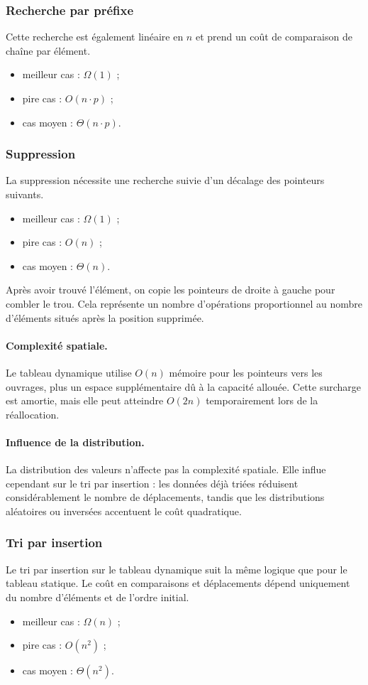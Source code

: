 \documentclass[12pt,a4paper]{article}
\begin{document}
\subsubsection{Recherche par préfixe}
Cette recherche est également linéaire en $n$ et prend un coût de comparaison de chaîne par élément.
\begin{itemize}
  \item meilleur cas : $\Omega(1)$ ;
  \item pire cas : $O(n \cdot p)$ ;
  \item cas moyen : $\Theta(n \cdot p)$.
\end{itemize}

\subsubsection{Suppression}
La suppression nécessite une recherche suivie d’un décalage des pointeurs suivants.
\begin{itemize}
  \item meilleur cas : $\Omega(1)$ ;
  \item pire cas : $O(n)$ ;
  \item cas moyen : $\Theta(n)$.
\end{itemize}
Après avoir trouvé l’élément, on copie les pointeurs de droite à gauche pour combler le trou. Cela représente un nombre d’opérations proportionnel au nombre d’éléments situés après la position supprimée.

\paragraph{Complexité spatiale.} Le tableau dynamique utilise $O(n)$ mémoire pour les pointeurs vers les ouvrages, plus un espace supplémentaire dû à la capacité allouée. Cette surcharge est amortie, mais elle peut atteindre $O(2n)$ temporairement lors de la réallocation.

\paragraph{Influence de la distribution.} La distribution des valeurs n’affecte pas la complexité spatiale. Elle influe cependant sur le tri par insertion : les données déjà triées réduisent considérablement le nombre de déplacements, tandis que les distributions aléatoires ou inversées accentuent le coût quadratique.

\subsubsection{Tri par insertion}
Le tri par insertion sur le tableau dynamique suit la même logique que pour le tableau statique. Le coût en comparaisons et déplacements dépend uniquement du nombre d’éléments et de l’ordre initial.
\begin{itemize}
  \item meilleur cas : $\Omega(n)$ ;
  \item pire cas : $O(n^2)$ ;
  \item cas moyen : $\Theta(n^2)$.
\end{itemize}
\end{document}
